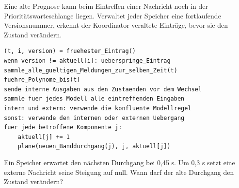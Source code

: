 Eine alte Prognose kann beim Eintreffen einer Nachricht noch in der Prioritätswarteschlange liegen. Verwaltet jeder Speicher eine fortlaufende Versionsnummer, erkennt der Koordinator veraltete Einträge, bevor sie den Zustand verändern.
{\small\begin{verbatim}
(t, i, version) = fruehester_Eintrag()
wenn version != aktuell[i]: ueberspringe_Eintrag
sammle_alle_gueltigen_Meldungen_zur_selben_Zeit(t)
fuehre_Polynome_bis(t)
sende interne Ausgaben aus den Zustaenden vor dem Wechsel
sammle fuer jedes Modell alle eintreffenden Eingaben
intern und extern: verwende die konfluente Modellregel
sonst: verwende den internen oder externen Uebergang
fuer jede betroffene Komponente j:
    aktuell[j] += 1
    plane(neuen_Banddurchgang(j), j, aktuell[j])
\end{verbatim}}
Ein Speicher erwartet den nächsten Durchgang bei 0,45 s. Um 0,3 s setzt eine externe Nachricht seine Steigung auf null. Wann darf der alte Durchgang den Zustand verändern?
